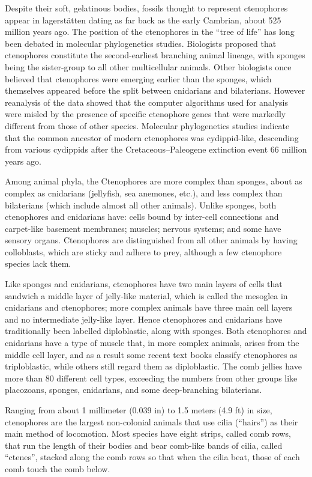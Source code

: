 Despite their soft, gelatinous bodies, fossils thought to represent ctenophores appear in lagerstätten dating as far back as the early Cambrian, about 525 million years ago. The position of the ctenophores in the ``tree of life'' has long been debated in molecular phylogenetics studies. Biologists proposed that ctenophores constitute the second-earliest branching animal lineage, with sponges being the sister-group to all other multicellular animals. Other biologists once believed that ctenophores were emerging earlier than the sponges, which themselves appeared before the split between cnidarians and bilaterians. However reanalysis of the data showed that the computer algorithms used for analysis were misled by the presence of specific ctenophore genes that were markedly different from those of other species. Molecular phylogenetics studies indicate that the common ancestor of modern ctenophores was cydippid-like, descending from various cydippids after the Cretaceous--Paleogene extinction event 66 million years ago.

Among animal phyla, the Ctenophores are more complex than sponges, about as complex as cnidarians (jellyfish, sea anemones, etc.), and less complex than bilaterians (which include almost all other animals). Unlike sponges, both ctenophores and cnidarians have: cells bound by inter-cell connections and carpet-like basement membranes; muscles; nervous systems; and some have sensory organs. Ctenophores are distinguished from all other animals by having colloblasts, which are sticky and adhere to prey, although a few ctenophore species lack them.

Like sponges and cnidarians, ctenophores have two main layers of cells that sandwich a middle layer of jelly-like material, which is called the mesoglea in cnidarians and ctenophores; more complex animals have three main cell layers and no intermediate jelly-like layer. Hence ctenophores and cnidarians have traditionally been labelled diploblastic, along with sponges. Both ctenophores and cnidarians have a type of muscle that, in more complex animals, arises from the middle cell layer, and as a result some recent text books classify ctenophores as triploblastic, while others still regard them as diploblastic. The comb jellies have more than 80 different cell types, exceeding the numbers from other groups like placozoans, sponges, cnidarians, and some deep-branching bilaterians.

Ranging from about 1 millimeter (0.039 in) to 1.5 meters (4.9 ft) in size, ctenophores are the largest non-colonial animals that use cilia (``hairs'') as their main method of locomotion. Most species have eight strips, called comb rows, that run the length of their bodies and bear comb-like bands of cilia, called ``ctenes'', stacked along the comb rows so that when the cilia beat, those of each comb touch the comb below.

